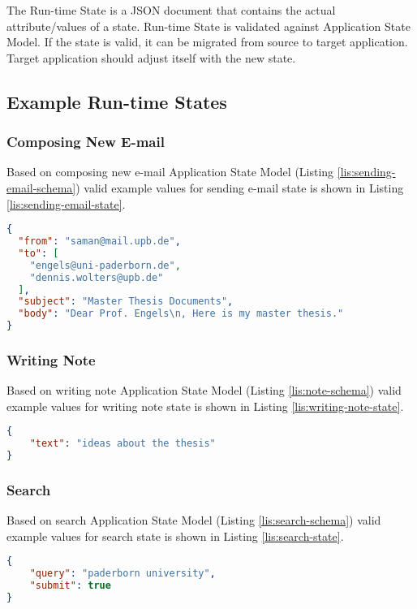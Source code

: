 The Run-time State is a JSON document that contains the actual attribute/values of a state. Run-time State is validated against Application State Model. If the state is valid, it can be migrated from source to target application.
Target application should adjust itself with the new state.

\subsection{Example Run-time States}

\subsubsection{Composing New E-mail}
Based on composing new e-mail Application State Model (Listing \ref{lis:sending-email-schema}) valid example values for sending e-mail state is shown in Listing \ref{lis:sending-email-state}.

\lstset{
  label=lis:sending-email-state, caption=A Run-time State for sending e-mail as JSON document., 
}
\begin{lstlisting}[language=json]
{
  "from": "saman@mail.upb.de",
  "to": [
    "engels@uni-paderborn.de",
    "dennis.wolters@upb.de"
  ],
  "subject": "Master Thesis Documents",
  "body": "Dear Prof. Engels\n, Here is my master thesis."
}
\end{lstlisting}


\subsubsection{Writing Note}
Based on writing note Application State Model (Listing \ref{lis:note-schema}) valid example values for writing note state is shown in Listing \ref{lis:writing-note-state}.
 
\lstset{
  label=lis:writing-note-state, caption=A Run-time State for writing note as JSON document.
}
\begin{lstlisting}[language=json]
{
    "text": "ideas about the thesis"
}
\end{lstlisting}

\subsubsection{Search}
Based on search Application State Model (Listing \ref{lis:search-schema}) valid example values for search state is shown in Listing \ref{lis:search-state}.
\lstset{
  label=lis:search-state, caption=A Run-time State for search as JSON document.
}
\begin{lstlisting}[language=json]
{
    "query": "paderborn university",
    "submit": true
}
\end{lstlisting}